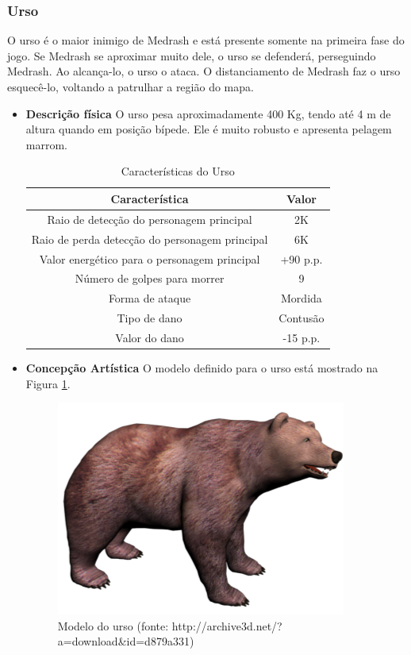 \subsubsection{Urso}
O urso é o maior inimigo de Medrash e está presente somente na primeira
 fase do jogo. Se Medrash se aproximar muito dele, o urso se defenderá,
 perseguindo Medrash. Ao alcança-lo, o urso o ataca. O distanciamento de
 Medrash faz o urso esquecê-lo, voltando a patrulhar a região do mapa.
\begin{itemize}
\item {\bf Descrição física}
O urso pesa aproximadamente 400 Kg, tendo até 4 m de altura quando em
 posição bípede. Ele é muito robusto e apresenta pelagem marrom.


\begin{table}[H]
\begin{center}
\begin{tabular}{|c|c|}
\hline 
\textbf{Característica} & \textbf{Valor} \\ 
\hline 
Raio de detecção do personagem principal & 2K \\ 
\hline 
Raio de perda detecção do personagem principal & 6K \\ 
\hline 
Valor energético para o personagem principal & +90 p.p. \\ 
\hline 
Número de golpes para morrer & 9 \\ 
\hline 
Forma de ataque & Mordida \\ 
\hline 
Tipo de dano & Contusão \\ 
\hline 
Valor do dano & -15 p.p. \\ 
\hline 
\end{tabular} 
\caption{Características do Urso}
\end{center}
\end{table}


\item {\bf Concepção Artística}
O modelo definido para o urso está mostrado na Figura \ref{img:urso}.

\begin{figure}[H]
 \centering
 \includegraphics[scale=0.8]{Imagens/urso01.png}
 \caption{Modelo do urso (fonte: http://archive3d.net/?a=download\&id=d879a331)}
\label{img:urso}
\end{figure}


\end{itemize}
